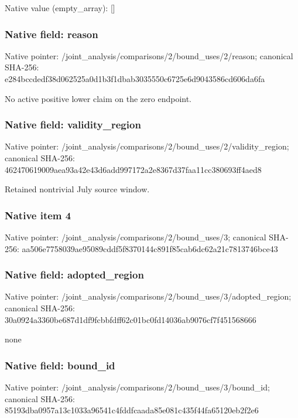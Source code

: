 \documentclass[10pt,a4paper]{article}
\begin{document}
Native value (empty\_\allowbreak{}array): []

\subsubsection{Native field: reason}
Native pointer: /joint\_\allowbreak{}analysis/comparisons/2/bound\_\allowbreak{}uses/2/reason; canonical SHA-256: e284bccdedf38d062525a0d1b3f1dbab3035550c6725e6d9043586cd606da6fa

\begingroup\raggedright\sloppy No active positive lower claim on the zero endpoint.\par\endgroup

\subsubsection{Native field: validity\_\allowbreak{}region}
Native pointer: /joint\_\allowbreak{}analysis/comparisons/2/bound\_\allowbreak{}uses/2/validity\_\allowbreak{}region; canonical SHA-256: 462470619009aea93a42e43d6add997172a2e8367d37faa11cc380693ff4aed8

\begingroup\raggedright\sloppy Retained nontrivial July source window.\par\endgroup

\subsubsection{Native item 4}
Native pointer: /joint\_\allowbreak{}analysis/comparisons/2/bound\_\allowbreak{}uses/3; canonical SHA-256: aa506e7758039ae95089cddf5f8370144c891f85cab6dc62a21c7813746bce43

\subsubsection{Native field: adopted\_\allowbreak{}region}
Native pointer: /joint\_\allowbreak{}analysis/comparisons/2/bound\_\allowbreak{}uses/3/adopted\_\allowbreak{}region; canonical SHA-256: 30a0924a3360be687d1df9fcbbfdff62c01bc0fd14036ab9076cf7f451568666

\begingroup\raggedright\sloppy none\par\endgroup

\subsubsection{Native field: bound\_\allowbreak{}id}
Native pointer: /joint\_\allowbreak{}analysis/comparisons/2/bound\_\allowbreak{}uses/3/bound\_\allowbreak{}id; canonical SHA-256: 85193dba0957a13c1033a96541c4fddfcaada85e081c435f44fa65120eb2f2e6
\end{document}
